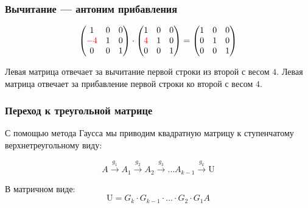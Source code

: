 \begin{frame}
    \frametitle{Вычитание — антоним прибавления}

    

    \[
    \begin{pmatrix}
        1 & 0 & 0 \\
        \textcolor{red}{-4} & 1 & 0 \\
        0 & 0 & 1 \\
    \end{pmatrix}   \cdot 
\begin{pmatrix}
    1 & 0 & 0 \\
    \textcolor{red}{4} & 1 & 0 \\
    0 & 0 & 1 \\
\end{pmatrix} =
\begin{pmatrix}
    1 & 0 & 0 \\
    0 & 1 & 0 \\
    0 & 0 & 1 \\
\end{pmatrix}   
    \]
    
\pause
Левая матрица отвечает за вычитание первой строки из второй с весом $4$.
\pause
Левая матрица отвечает за прибавление первой строки ко второй с весом $4$.


\end{frame}





\begin{frame}
    \frametitle{Переход к треугольной матрице}

    С помощью метода Гаусса мы приводим квадратную матрицу к ступенчатому верхнетреугольному виду:

    \[
    A \overset{g_1}{\to} A_1  \overset{g_2}{\to} A_2 \overset{g_3}{\to} \ldots A_{k-1}\overset{g_k}{\to} \mathrm{U} 
    \]
    \pause

    В матричном виде:
    \[
    \mathrm{U} = G_k \cdot G_{k-1} \cdot \ldots  \cdot  G_2 \cdot G_{1} A
    \]    

\end{frame}


